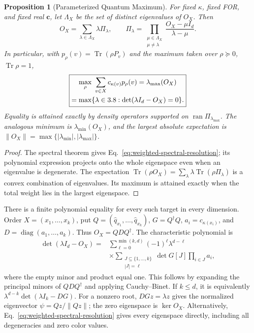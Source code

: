 \documentclass[aps,pra,reprint,superscriptaddress,longbibliography,nofootinbib,floatfix,10pt]{revtex4-2}
\newtheorem{proposition}[theorem]{Proposition}
\theoremstyle{definition}\newtheorem{definition}[theorem]{Definition}
\theoremstyle{remark}\newtheorem{remark}[theorem]{Remark}
\DeclareMathOperator{\diag}{diag}\DeclareMathOperator{\Tr}{Tr}\DeclareMathOperator{\tr}{tr}
\begin{document}
\begin{proposition}[Parameterized Quantum Maximum]\label{prop:weighted-maximum}
For fixed $\kappa$, fixed FOR, and fixed real $\mathbf c$, let $\Lambda_X$ be the set of distinct eigenvalues of $O_X$. Then
\begin{equation}\label{eq:weighted-spectral-resolution}
O_X=\sum_{\lambda\in\Lambda_X}\lambda\Pi_\lambda,
\qquad
\Pi_\lambda=\prod_{\substack{\mu\in\Lambda_X\\\mu\ne\lambda}}
\frac{O_X-\mu I_d}{\lambda-\mu}.
\end{equation}
In particular, with $p_\rho(v)=\Tr(\rho P_v)$ and the maximum taken over $\rho\succeq0$, $\Tr\rho=1$,
\begin{equation}\label{eq:weighted-max-equality}
\boxed{\begin{gathered}
\max_\rho\ \sum_{v\in X}c_{\kappa(v)}p_\rho(v)
=\lambda_{\max}(O_X)\\
=\max\{\lambda\in3.8:\det(\lambda I_d-O_X)=0\}.
\end{gathered}}
\end{equation}
Equality is attained exactly by density operators supported on $\operatorname{ran}\Pi_{\lambda_{\max}}$. The analogous minimum is $\lambda_{\min}(O_X)$, and the largest absolute expectation is $\|O_X\|=\max\{|\lambda_{\min}|,|\lambda_{\max}|\}$.
\end{proposition}
\begin{proof}
The spectral theorem gives Eq.~\eqref{eq:weighted-spectral-resolution}; its polynomial expression projects onto the whole eigenspace even when an eigenvalue is degenerate. The expectation $\Tr(\rho O_X)=\sum_\lambda\lambda\Tr(\rho\Pi_\lambda)$ is a convex combination of eigenvalues. Its maximum is attained exactly when the total weight lies in the largest eigenspace.
\end{proof}

There is a finite polynomial equality for every such target in every dimension. Order $X=(x_1,\ldots,x_k)$, put $Q=(\hat q_{x_1},\ldots,\hat q_{x_k})$, $G=Q^\dagger Q$, $a_i=c_{\kappa(x_i)}$, and $D=\diag(a_1,\ldots,a_k)$. Thus $O_X=QDQ^\dagger$. The characteristic polynomial is
\begin{equation}\label{eq:weighted-principal-minors}
\begin{aligned}
\det(\lambda I_d-O_X)
={}&\sum_{\ell=0}^{\min(k,d)}(-1)^\ell\lambda^{d-\ell}\\
&\times\sum_{\substack{J\subseteq\{1,\ldots,k\}\\|J|=\ell}}
\det G[J]\prod_{i\in J}a_i,
\end{aligned}
\end{equation}
where the empty minor and product equal one. This follows by expanding the principal minors of $QDQ^\dagger$ and applying Cauchy--Binet. If $k\le d$, it is equivalently $\lambda^{d-k}\det(\lambda I_k-DG)$. For a nonzero root, $DGz=\lambda z$ gives the normalized eigenvector $\psi=Qz/\|Qz\|$; the zero eigenspace is $\ker O_X$. Alternatively, Eq.~\eqref{eq:weighted-spectral-resolution} gives every eigenspace directly, including all degeneracies and zero color values.
\end{document}
